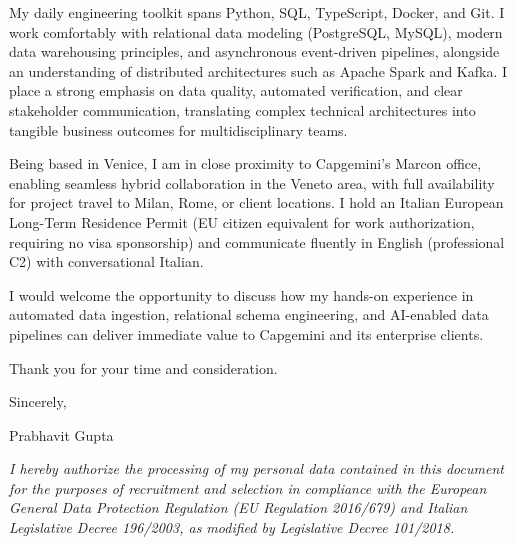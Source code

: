 \documentclass[11pt,a4paper]{article}
\begin{document}
My daily engineering toolkit spans Python, SQL, TypeScript, Docker, and Git. I work comfortably with relational data modeling (PostgreSQL, MySQL), modern data warehousing principles, and asynchronous event-driven pipelines, alongside an understanding of distributed architectures such as Apache Spark and Kafka. I place a strong emphasis on data quality, automated verification, and clear stakeholder communication, translating complex technical architectures into tangible business outcomes for multidisciplinary teams.

Being based in Venice, I am in close proximity to Capgemini's Marcon office, enabling seamless hybrid collaboration in the Veneto area, with full availability for project travel to Milan, Rome, or client locations. I hold an Italian European Long-Term Residence Permit (EU citizen equivalent for work authorization, requiring no visa sponsorship) and communicate fluently in English (professional C2) with conversational Italian.

I would welcome the opportunity to discuss how my hands-on experience in automated data ingestion, relational schema engineering, and AI-enabled data pipelines can deliver immediate value to Capgemini and its enterprise clients.

Thank you for your time and consideration.

Sincerely,

Prabhavit Gupta

\vspace{0.6em}
{\footnotesize \textit{I hereby authorize the processing of my personal data contained in this document for the purposes of recruitment and selection in compliance with the European General Data Protection Regulation (EU Regulation 2016/679) and Italian Legislative Decree 196/2003, as modified by Legislative Decree 101/2018.}\par}
\end{document}

